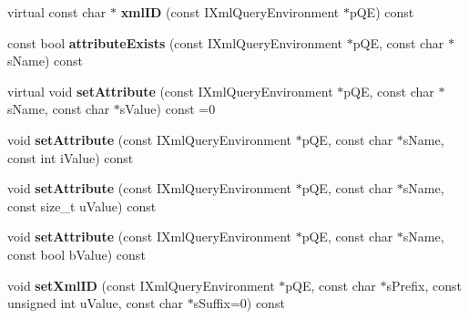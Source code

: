 \begin{DoxyCompactItemize}
\item 
\hypertarget{classgeneral__server_1_1XmlBaseNode_ae3df57970db88c87842dd91db3a6a841}{virtual const char $\ast$ {\bfseries xml\-I\-D} (const \-I\-Xml\-Query\-Environment $\ast$p\-Q\-E) const }\label{classgeneral__server_1_1XmlBaseNode_ae3df57970db88c87842dd91db3a6a841}

\item 
\hypertarget{classgeneral__server_1_1XmlBaseNode_ae8fe9ff02c151bc73c02234a5ee8ee3f}{const bool {\bfseries attribute\-Exists} (const \-I\-Xml\-Query\-Environment $\ast$p\-Q\-E, const char $\ast$s\-Name) const }\label{classgeneral__server_1_1XmlBaseNode_ae8fe9ff02c151bc73c02234a5ee8ee3f}

\item 
\hypertarget{classgeneral__server_1_1XmlBaseNode_a447921f2ecd217f4a7467cf40753ac00}{virtual void {\bfseries set\-Attribute} (const \-I\-Xml\-Query\-Environment $\ast$p\-Q\-E, const char $\ast$s\-Name, const char $\ast$s\-Value) const =0}\label{classgeneral__server_1_1XmlBaseNode_a447921f2ecd217f4a7467cf40753ac00}

\item 
\hypertarget{classgeneral__server_1_1XmlBaseNode_a1f4ad52be88e027672fecb12a4dec7d5}{void {\bfseries set\-Attribute} (const \-I\-Xml\-Query\-Environment $\ast$p\-Q\-E, const char $\ast$s\-Name, const int i\-Value) const }\label{classgeneral__server_1_1XmlBaseNode_a1f4ad52be88e027672fecb12a4dec7d5}

\item 
\hypertarget{classgeneral__server_1_1XmlBaseNode_a6a6f0ff29daf47114d5621f9c401841b}{void {\bfseries set\-Attribute} (const \-I\-Xml\-Query\-Environment $\ast$p\-Q\-E, const char $\ast$s\-Name, const size\-\_\-t u\-Value) const }\label{classgeneral__server_1_1XmlBaseNode_a6a6f0ff29daf47114d5621f9c401841b}

\item 
\hypertarget{classgeneral__server_1_1XmlBaseNode_afd59d509b938e3eab811b23bff8a4145}{void {\bfseries set\-Attribute} (const \-I\-Xml\-Query\-Environment $\ast$p\-Q\-E, const char $\ast$s\-Name, const bool b\-Value) const }\label{classgeneral__server_1_1XmlBaseNode_afd59d509b938e3eab811b23bff8a4145}

\item 
\hypertarget{classgeneral__server_1_1XmlBaseNode_acc0862c406bac036d3907d77bd4f2dcd}{void {\bfseries set\-Xml\-I\-D} (const \-I\-Xml\-Query\-Environment $\ast$p\-Q\-E, const char $\ast$s\-Prefix, const unsigned int u\-Value, const char $\ast$s\-Suffix=0) const }\label{classgeneral__server_1_1XmlBaseNode_acc0862c406bac036d3907d77bd4f2dcd}


\end{DoxyCompactItemize}
